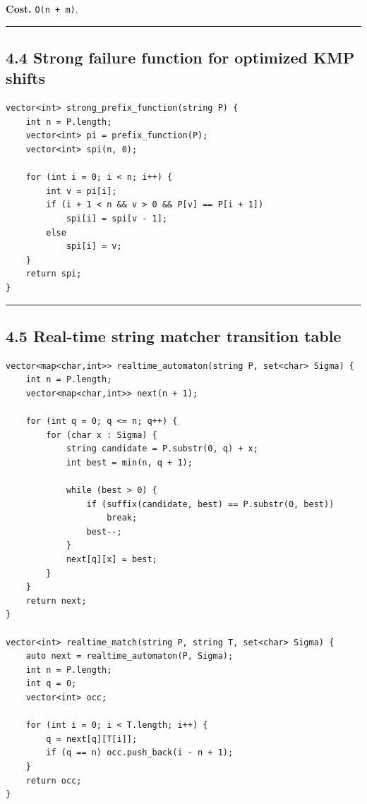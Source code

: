 \documentclass[11pt]{article}
\begin{document}
\textbf{Cost.} \texttt{O(n + m)}.

\begin{center}\rule{0.5\linewidth}{0.5pt}\end{center}

\subsection{4.4 Strong failure function for optimized KMP shifts}\label{strong-failure-function-for-optimized-kmp-shifts}

\begin{verbatim}
vector<int> strong_prefix_function(string P) {
    int n = P.length;
    vector<int> pi = prefix_function(P);
    vector<int> spi(n, 0);

    for (int i = 0; i < n; i++) {
        int v = pi[i];
        if (i + 1 < n && v > 0 && P[v] == P[i + 1])
            spi[i] = spi[v - 1];
        else
            spi[i] = v;
    }
    return spi;
}
\end{verbatim}

\begin{center}\rule{0.5\linewidth}{0.5pt}\end{center}

\subsection{4.5 Real-time string matcher transition table}\label{real-time-string-matcher-transition-table}

\begin{verbatim}
vector<map<char,int>> realtime_automaton(string P, set<char> Sigma) {
    int n = P.length;
    vector<map<char,int>> next(n + 1);

    for (int q = 0; q <= n; q++) {
        for (char x : Sigma) {
            string candidate = P.substr(0, q) + x;
            int best = min(n, q + 1);

            while (best > 0) {
                if (suffix(candidate, best) == P.substr(0, best))
                    break;
                best--;
            }
            next[q][x] = best;
        }
    }
    return next;
}

vector<int> realtime_match(string P, string T, set<char> Sigma) {
    auto next = realtime_automaton(P, Sigma);
    int n = P.length;
    int q = 0;
    vector<int> occ;

    for (int i = 0; i < T.length; i++) {
        q = next[q][T[i]];
        if (q == n) occ.push_back(i - n + 1);
    }
    return occ;
}
\end{verbatim}
\end{document}
